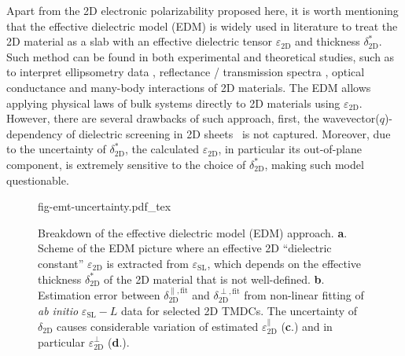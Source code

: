 Apart from the 2D electronic polarizability proposed here, it is worth
mentioning that the effective dielectric model (EDM) is widely used in
literature to treat the 2D material as a slab with an effective
dielectric tensor $\varepsilon_{\mathrm{2D}}$ and thickness
$\delta^{*}_{\mathrm{2D}}$. Such method can be found in both
experimental and theoretical studies, such as to interpret
ellipsometry data
\autocite{graphene-epsilon10,Duesberg_2014_opt_MoS2,Chiang13,},
reflectance / transmission spectra
\autocite{Li_2014_opt_ml_mos2,Yoffe-Wilson_1969_TMDC}, optical conductance
\autocite{Matthes_2016_effective_PRB} and many-body interactions
\autocite{Sohier_2016_2D_eps,Markel_2016_EMT} of 2D materials. The EDM
allows applying physical laws of bulk systems directly to 2D materials
using $\varepsilon_{\mathrm{2D}}$. However, there are several
drawbacks of such approach, first, the
wavevector($q$)-dependency of dielectric screening in 2D
sheets~\autocite{Cudazzo_2011_screening_2D,Olsen_2016_hydrogen,Trolle_2017_eps_subst}
is not captured. Moreover, due to the
uncertainty of $\delta^{*}_{\mathrm{2D}}$, the calculated
$\varepsilon_{\mathrm{2D}}$, in particular its out-of-plane component,
is extremely sensitive to the choice of $\delta^{*}_{\mathrm{2D}}$,
making such model questionable.


\begin{figure}[!htbp]
  \centering
  {fig-emt-uncertainty.pdf_tex}
  \caption{\label{fig-emt} %
    Breakdown of the effective dielectric model (EDM)
    approach. \textbf{a}.  Scheme of the EDM picture where an
    effective 2D ``dielectric constant'' $\varepsilon_{\mathrm{2D}}$
    is extracted from $\varepsilon_{\mathrm{SL}}$, which depends on
    the effective thickness $\delta_{\mathrm{2D}}^{*}$ of the 2D
    material that is not well-defined. \textbf{b}.  Estimation error
    between $\delta_{\mathrm{2D}}^{\parallel, \text{fit}}$ and
    $\delta_{\mathrm{2D}}^{\perp, \text{fit}}$ from non-linear fitting
    of \textit{ab initio} $\varepsilon_{\mathrm{SL}} - L$ data for
    selected 2D TMDCs. The uncertainty of $\delta_{\mathrm{2D}}$
    causes considerable variation of estimated
    $\varepsilon_{\mathrm{2D}}^{\parallel}$ (\textbf{c}.) and in
    particular $\varepsilon_{\mathrm{2D}}^{\perp}$ (\textbf{d}.).  }
\end{figure}

